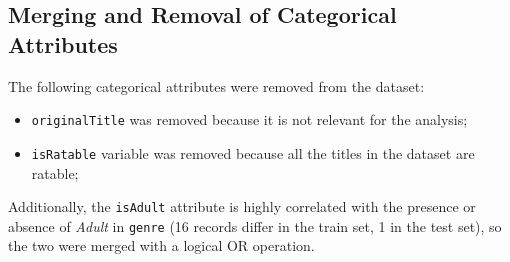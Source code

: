     
    


\subsection{Merging and Removal of Categorical Attributes}\label{subsec:var_elim_discrete}
The following categorical attributes were removed from the dataset:
\begin{itemize}
    \item \texttt{originalTitle} was removed because it is not relevant for the analysis;
    \item \texttt{isRatable} variable was removed because all the titles in the dataset are ratable;
\end{itemize}

Additionally, the \texttt{isAdult} attribute is highly correlated with the presence or absence of
\textit{Adult} in \texttt{genre} (16 records differ in the train set, 1 in the test set), so the two were
merged with a logical OR operation.


